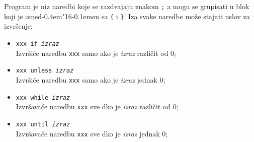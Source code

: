 \documentclass[12pt,a4paper]{article}
\def\d{d\kern-0.4em\char"16\kern-0.1em}
\begin{document}
        Program je niz naredbi koje se razdvajaju znakom {\tt;} a mogu se
        grupisati u blok koji je ome\d en sa {\tt\{} i {\tt\}}.
        Iza svake naredbe mo\v ze stajati uslov za izvr\v senje:
        \begin{itemize}
        \item
          {\tt xxx if {\it izraz}}\\
          Izvr\v si\'ce naredbu {\tt xxx} samo ako je {\it izraz} razli\v cit
          od 0;
        \item
          {\tt xxx unless {\it izraz}}\\
          Izvr\v si\'ce naredbu {\tt xxx} samo ako je {\it izraz} jednak 0;
        \item
          {\tt xxx while {\it izraz}}\\
          Izvr\v sava\'ce naredbu {\tt xxx} sve dko je {\it izraz} razli\v cit
          od 0;
        \item
          {\tt xxx until {\it izraz}}\\
          Izvr\v sava\'ce naredbu {\tt xxx} sve dko je {\it izraz} jednak 0;
        \end{itemize}
\end{document}
